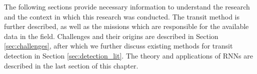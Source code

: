 
The following sections provide necessary information to understand the research and the context in which this research was conducted. The transit method is further described, as well as the missions which are responsible for the available data in the field. Challenges and their origins are described in Section \ref{sec:challenges}, after which we further discuss existing methods for transit detection in Section \ref{sec:detection_lit}. The theory and applications of RNNs are described in the last section of this chapter.